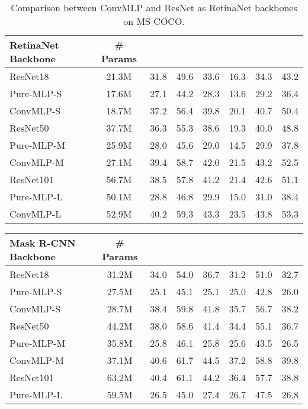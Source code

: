 \documentclass[final]{cvpr}
\begin{document}
\begin{table*}[!ht]
\centering
\begin{tabular}{l|c|ccc|ccc}
\toprule[2pt]
RetinaNet Backbone & \# Params &  &  &  &  &  &  \\ 
\midrule[1.5pt]
ResNet18~\cite{he2016deep} & 21.3M & 31.8 & 49.6 & 33.6 & 16.3 & 34.3 & 43.2\\
Pure-MLP-S & 17.6M &27.1 & 44.2 & 28.3 & 13.6 & 29.2 & 36.4 \\
ConvMLP-S & 18.7M & 37.2 & 56.4 & 39.8 & 20.1 & 40.7 & 50.4 \\
\midrule
ResNet50~\cite{he2016deep} & 37.7M & 36.3 & 55.3 & 38.6 & 19.3 & 40.0 & 48.8 \\
Pure-MLP-M & 25.9M &28.0 & 45.6 &29.0 &14.5 &29.9 &37.8 \\
ConvMLP-M & 27.1M & 39.4 & 58.7 & 42.0 & 21.5 & 43.2 & 52.5 \\
\midrule
ResNet101~\cite{he2016deep} & 56.7M & 38.5 & 57.8 & 41.2 & 21.4 & 42.6 & 51.1\\
Pure-MLP-L & 50.1M & 28.8 & 46.8 & 29.9 & 15.0 &31.0 &38.4 \\
ConvMLP-L & 52.9M & 40.2 & 59.3 & 43.3 & 23.5 & 43.8 & 53.3 \\
\bottomrule[2pt]
\end{tabular} 
\caption{Comparison between ConvMLP and ResNet as RetinaNet backbones on MS COCO.}
\label{tab:retinanet}
\end{table*} \begin{table*}[!ht]
\centering
\begin{tabular}{l|c|ccc|ccc}
\toprule[2pt]
Mask R-CNN Backbone & \# Params &  &  &  &  &  &  \\ 
\midrule[1.5pt]
ResNet18~\cite{he2016deep} & 31.2M & 34.0 & 54.0 & 36.7 & 31.2 & 51.0 & 32.7 \\
Pure-MLP-S & 27.5M & 25.1 & 45.1 & 25.1 & 25.0  & 42.8  & 26.0 \\
ConvMLP-S & 28.7M & 38.4 & 59.8 & 41.8 & 35.7 & 56.7 & 38.2 \\
\midrule
ResNet50~\cite{he2016deep} & 44.2M & 38.0 & 58.6 & 41.4 & 34.4 & 55.1 & 36.7 \\
Pure-MLP-M & 35.8M  & 25.8 & 46.1 &25.8 & 25.6 & 43.5 & 26.5 \\
ConvMLP-M & 37.1M & 40.6 & 61.7 & 44.5 & 37.2 & 58.8 & 39.8 \\
\midrule
ResNet101~\cite{he2016deep} & 63.2M & 40.4 & 61.1 & 44.2 & 36.4 & 57.7 & 38.8 \\
Pure-MLP-L & 59.5M  & 26.5 & 45.0 &27.4 & 26.7 & 47.5 & 26.8 \\

\end{tabular}
\end{table*}
\end{document}
